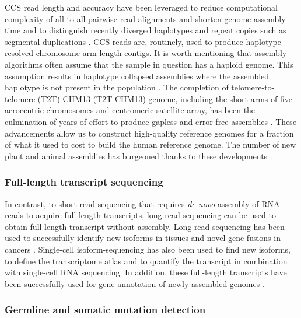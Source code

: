 CCS read length and accuracy have been leveraged to reduce computational complexity of all-to-all pairwise read alignments and shorten genome assembly time \cite{Chin_undated-ye} and to distinguish recently diverged haplotypes and repeat copies such as segmental duplications \cite{Nurk2020-gu, Cheng2021-ij}. CCS reads are, routinely, used to produce haplotype-resolved chromosome-arm length contigs. It is worth mentioning that assembly algorithms often assume that the sample in question has a haploid genome. This assumption results in haplotype collapsed assemblies where the assembled haplotype is not present in the population \cite{Schneider2017-yo}. The completion of telomere-to-telomere (T2T) CHM13 (T2T-CHM13) genome, including the short arms of five acrocentric chromosomes and centromeric satellite array, has been the culmination of years of effort to produce gapless and error-free assemblies \cite{Nurk2022-dv}. These advancements allow us to construct high-quality reference genomes for a fraction of what it used to cost to build the human reference genome. The number of new plant and animal assemblies has burgeoned thanks to these developments \cite{}. 

\subsubsection{Full-length transcript sequencing}

In contrast, to short-read sequencing that requires \textit{de novo} assembly of RNA reads to acquire full-length transcripts, long-read sequencing can be used to obtain full-length transcript without assembly. Long-read sequencing has been used to successfully identify new isoforms in tissues and novel gene fusions in cancers \cite{}. Single-cell isoform-sequencing has also been used to find new isoforms, to define the transcriptome atlas and to quantify the transcript in combination with single-cell RNA sequencing. In addition, these full-length transcripts have been successfully used for gene annotation of newly assembled genomes \cite{}.

\subsubsection{Germline and somatic mutation detection}


